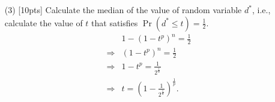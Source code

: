 \documentclass{article}
\begin{document}
\begin{enumerate}
        \item [(3)] [10pts] Calculate the median of the value of random variable $d^*$, i.e., calculate the value of $t$ that satisfies $\operatorname{Pr}\left(d^{*} \leq t\right)= \frac{1}{2}$.
        \begin{equation}
            \begin{aligned}
                & 1-(1-t^p)^n = \frac{1}{2}\\
                \Rightarrow & (1-t^p)^n = \frac{1}{2}\\
                \Rightarrow & 1-t^p = \frac{1}{2^{\frac{1}{n}}}\\
                \Rightarrow & t = (1-\frac{1}{2^{\frac{1}{n}}})^{\frac{1}{p}}.
            \end{aligned}
        \end{equation}
    
    \end{enumerate}
	
	\newpage
	
	
\end{document}
